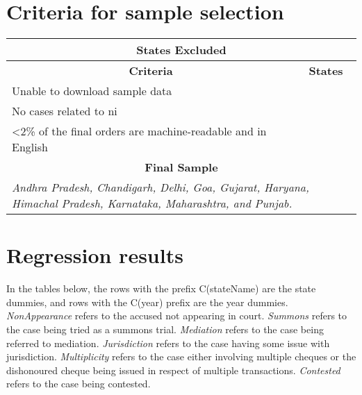 \section{Criteria for sample selection} \label{sec:sample_selection}

\begin{longtable}{p{}p{}}
\label{tab:sample_selection}
\\
\toprule
\multicolumn{2}{c}{\textbf{States Excluded}} \\ \midrule
\multicolumn{1}{c|}{\textbf{Criteria}} & \multicolumn{1}{c}{\textbf{States}} \\ \midrule
\multicolumn{1}{p{0.32\textwidth}|}{Unable to download sample data} & \\ \midrule
\multicolumn{1}{p{0.32\textwidth}|}{No cases related to \gls{ni}} &  \\ \midrule
\multicolumn{1}{p{0.32\textwidth}|}{\textless 2\% of the final orders are machine-readable and in English} &  \\ \midrule
\multicolumn{2}{c}{\textbf{Final Sample}} \\ \midrule
 \multicolumn{2}{p{0.92\textwidth}}{\textit{Andhra Pradesh, Chandigarh, Delhi, Goa, Gujarat, Haryana, Himachal Pradesh, Karnataka, Maharashtra, and Punjab.}} \\ \bottomrule
\end{longtable}

\pagebreak

\section{Regression results} \label{sec:regression-results-1}

In the tables below, the rows with the prefix C(stateName) are the state dummies, and rows with the C(year) prefix are the year dummies. \emph{NonAppearance} refers to the accused not appearing in court. \emph{Summons} refers to the case being tried as a summons trial. \emph{Mediation} refers to the case being referred to mediation. \emph{Jurisdiction} refers to the case having some issue with jurisdiction. \emph{Multiplicity} refers to the case either involving multiple cheques or the dishonoured cheque being issued in respect of multiple transactions. \emph{Contested} refers to the case being contested.

